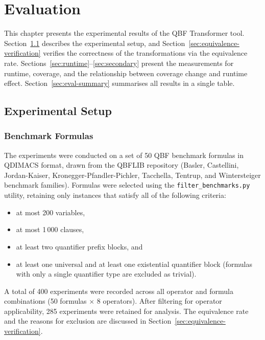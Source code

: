 \chapter{Evaluation}\label{cha:evaluation}

This chapter presents the experimental results of the QBF Transformer tool. 
Section~\ref{sec:setup} describes the experimental setup, and Section~\ref{sec:equivalence-verification} verifies the correctness of the transformations via the equivalence rate. Sections~\ref{sec:runtime}--\ref{sec:secondary} present the measurements for runtime, coverage, and the relationship between coverage change and runtime effect. Section~\ref{sec:eval-summary} summarises all results in a single table.

\section{Experimental Setup}\label{sec:setup}

\subsection{Benchmark Formulas}\label{sec:benchmarks}

The experiments were conducted on a set of 50 QBF benchmark formulas in
QDIMACS format, drawn from the QBFLIB repository (Basler, Castellini,
Jordan-Kaiser, Kronegger-Pfandler-Pichler, Tacchella, Tentrup, and
Wintersteiger benchmark families).
Formulas were selected using the \texttt{filter\_benchmarks.py} utility,
retaining only instances that satisfy all of the following criteria:
\begin{itemize}
  \item at most 200 variables,
  \item at most 1\,000 clauses,
  \item at least two quantifier prefix blocks, and
  \item at least one universal and at least one existential quantifier block
        (formulas with only a single quantifier type are excluded as trivial).
\end{itemize}
 
A total of 400 experiments were recorded across all operator and formula
combinations (50 formulas $\times$ 8 operators).
After filtering for operator applicability, 285 experiments were retained
for analysis.
The equivalence rate and the reasons for exclusion are discussed in
Section~\ref{sec:equivalence-verification}.


